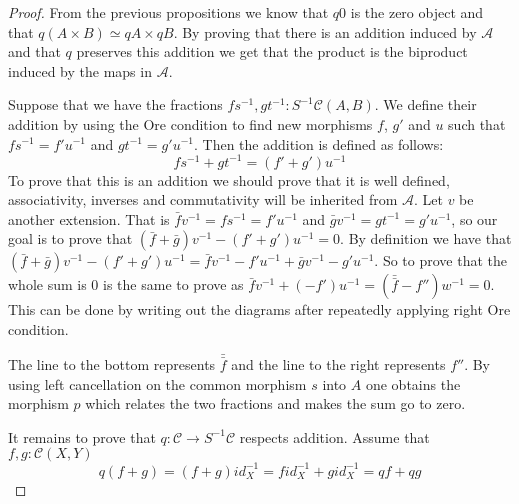     \begin{proof}
        From the previous propositions we know that $q0$ is the zero object and that $q(A\times B)\simeq qA\times qB$. By proving that there is an addition induced by $\mathcal{A}$ and that $q$ preserves this addition we get that the product is the biproduct induced by the maps in $\mathcal{A}$.

        Suppose that we have the fractions $fs^{-1}, gt^{-1}:S^{-1}\mathcal{C}(A,B)$. We define their addition by using the Ore condition  to find new morphisms $f$, $g'$ and $u$ such that $fs^{-1} = f'u^{-1}$ and $gt^{-1} = g'u^{-1}$. Then the addition is defined as follows:
        \begin{equation*}
            fs^{-1}+gt^{-1} = (f'+g')u^{-1}
        \end{equation*}
        To prove that this is an addition we should prove that it is well defined, associativity, inverses and commutativity will be inherited from $\mathcal{A}$.
        Let $v$ be another extension. That is $\bar{f}v^{-1}=fs^{-1}=f'u^{-1}$ and $\bar{g}v^{-1}=gt^{-1}=g'u^{-1}$, so our goal is to prove that $(\bar{f}+\bar{g})v^{-1}-(f'+g')u^{-1}=0$. By definition we have that $(\bar{f}+\bar{g})v^{-1}-(f'+g')u^{-1}=\bar{f}v^{-1}-f'u^{-1}+\bar{g}v^{-1}-g'u^{-1}$. So to prove that the whole sum is $0$ is the same to prove as $\bar{f}v^{-1}+(-f')u^{-1}=(\bar{\bar{f}}-f'')w^{-1}=0$. This can be done by writing out the diagrams after repeatedly applying right Ore condition.
        \begin{center}
        \end{center}
        The line to the bottom represents $\bar{\bar{f}}$ and the line to the right represents $f''$. By using left cancellation on the common morphism $s$ into $A$ one obtains the morphism $p$ which relates the two fractions and makes the sum go to zero.

        It remains to prove that $q:\mathcal{C}\rightarrow S^{-1}\mathcal{C}$ respects addition. Assume that $f,g:\mathcal{C}(X,Y)$
        \begin{equation*}
            q(f+g)=(f+g)id_X^{-1}=fid_X^{-1}+gid_X^{-1}=qf+qg
        \end{equation*} 
    \end{proof}

